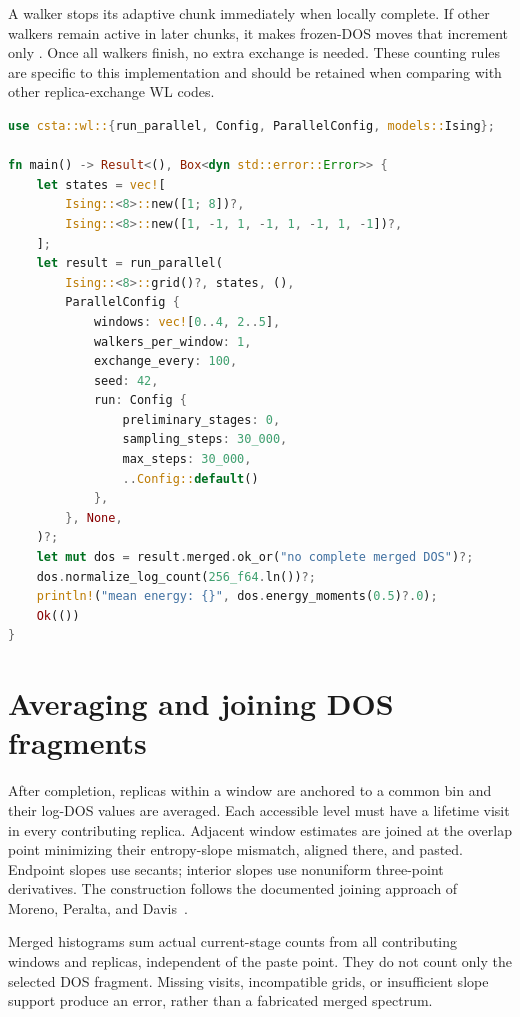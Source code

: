 \documentclass[11pt,a4paper,oneside]{report}
\newcommand{\api}[1]{\texttt{\detokenize{#1}}}
\begin{document}
A walker stops its adaptive chunk immediately when locally complete. If other
walkers remain active in later chunks, it makes frozen-DOS moves that increment
only \api{mixing_steps}. Once all walkers finish, no extra exchange is needed.
These counting rules are specific to this implementation and should be retained
when comparing with other replica-exchange WL codes.

\par\noindent\begin{minipage}{\linewidth}
\begin{lstlisting}[language=Rust,caption={Two overlapping windows with explicitly valid initial states.}]
use csta::wl::{run_parallel, Config, ParallelConfig, models::Ising};

fn main() -> Result<(), Box<dyn std::error::Error>> {
    let states = vec![
        Ising::<8>::new([1; 8])?,
        Ising::<8>::new([1, -1, 1, -1, 1, -1, 1, -1])?,
    ];
    let result = run_parallel(
        Ising::<8>::grid()?, states, (),
        ParallelConfig {
            windows: vec![0..4, 2..5],
            walkers_per_window: 1,
            exchange_every: 100,
            seed: 42,
            run: Config {
                preliminary_stages: 0,
                sampling_steps: 30_000,
                max_steps: 30_000,
                ..Config::default()
            },
        }, None,
    )?;
    let mut dos = result.merged.ok_or("no complete merged DOS")?;
    dos.normalize_log_count(256_f64.ln())?;
    println!("mean energy: {}", dos.energy_moments(0.5)?.0);
    Ok(())
}
\end{lstlisting}
\end{minipage}\par

\section{Averaging and joining DOS fragments}
After completion, replicas within a window are anchored to a common bin and
their log-DOS values are averaged. Each accessible level must have a lifetime
visit in every contributing replica. Adjacent window estimates are joined at
the overlap point minimizing their entropy-slope mismatch, aligned there, and
pasted. Endpoint slopes use secants; interior slopes use nonuniform three-point
derivatives. The construction follows the documented joining approach of
Moreno, Peralta, and Davis~\cite{moreno}.

Merged histograms sum actual current-stage counts from all contributing windows
and replicas, independent of the paste point. They do not count only the selected
DOS fragment. Missing visits, incompatible grids, or insufficient slope support
produce an error, rather than a fabricated merged spectrum.
\end{document}
